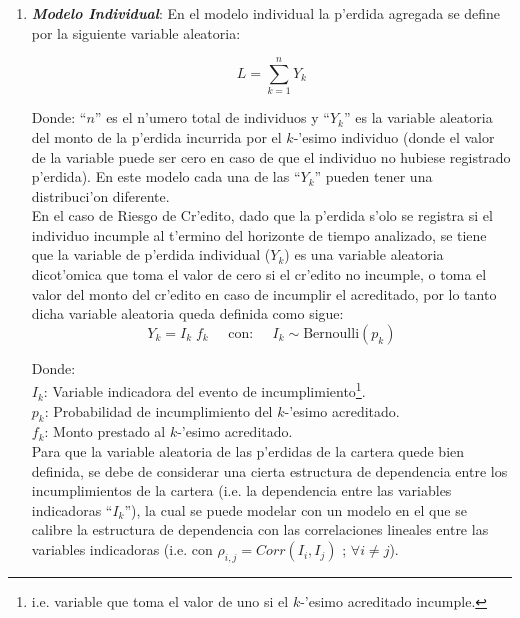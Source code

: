 \documentclass[10pt, oneside]{article}
\begin{document}
\begin{enumerate}
\item \textbf{\emph{Modelo Individual}}: 
En el modelo individual la p'erdida agregada se define por la siguiente variable aleatoria:

\[L = \sum_{k=1}^{n} Y_k\]

Donde: ``$n$'' es el n'umero total de individuos y ``$Y_k$'' es la variable aleatoria del monto de la p'erdida incurrida por el $k$-'esimo individuo (donde el valor de la variable puede ser cero en caso de que el individuo no hubiese registrado p'erdida). En este modelo cada una de las ``$Y_k$'' pueden tener una distribuci'on diferente.\\


En el caso de Riesgo de Cr'edito, dado que la p'erdida s'olo se registra si el individuo incumple al t'ermino del horizonte de tiempo analizado, se tiene que la variable de p'erdida individual ($Y_k$) es una variable aleatoria dicot'omica que toma el valor de cero si el cr'edito no incumple, o toma el valor del monto del cr'edito en caso de incumplir el acreditado, por lo tanto dicha variable aleatoria queda definida como sigue:\\

\[Y_k = I_k\;f_k\;\;\;\;\;\mbox{con:}\;\;\;\;\;I_k\sim\mbox{Bernoulli}(p_k)\]

\indent  Donde:\\
\indent \indent $I_k$: Variable indicadora del evento de incumplimiento\footnote{i.e. variable que toma el valor de uno si el $k$-'esimo acreditado incumple.}.\\
\indent \indent $p_k$: Probabilidad de incumplimiento del $k$-'esimo acreditado.\\
\indent \indent $f_k$: Monto prestado al $k$-'esimo acreditado.\\

\noindent
Para que la variable aleatoria de las p'erdidas de la cartera quede bien definida, se debe de considerar una cierta estructura de dependencia entre los incumplimientos de la cartera (i.e. la dependencia entre las variables indicadoras ``$I_k$''), la cual se puede modelar con un modelo en el que se calibre la estructura de dependencia con las correlaciones lineales entre las variables indicadoras (i.e. con $\rho_{i,j} = Corr(I_i, I_j)$ ; $\forall i \neq j$).\\

\noindent




\end{enumerate}
\end{document}
